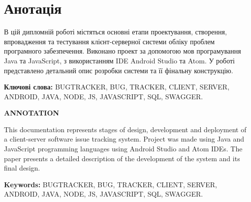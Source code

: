 \chapter*{Анотація}

В цій дипломній роботі містяться основні етапи проектування, створення, впровадження та тестування клієнт-серверної системи обліку проблем програмного забезпечення. Виконано проект за допомогою мов програмування Java та JavaScript, з використанням IDE Android Studio та Atom. У роботі представлено детальний опис розробки системи та її фінальну конструкцію.

\textbf{Ключові слова:} BUGTRACKER, BUG, TRACKER, CLIENT, SERVER, ANDROID, JAVA, NODE, JS, JAVASCRIPT, SQL, SWAGGER.

\hfill

\begin{center}
	\textbf{\MakeUppercase{Annotation}}
\end{center}

This documentation represents stages of design, development and deployment of a client-server software issue tracking system. Project was made using Java and JavaScript programming languages using Android Studio and Atom IDEs. The paper presents a detailed description of the development of the system and its final design.

\textbf{Keywords:} BUGTRACKER, BUG, TRACKER, CLIENT, SERVER, ANDROID, JAVA, NODE, JS, JAVASCRIPT, SQL, SWAGGER.
